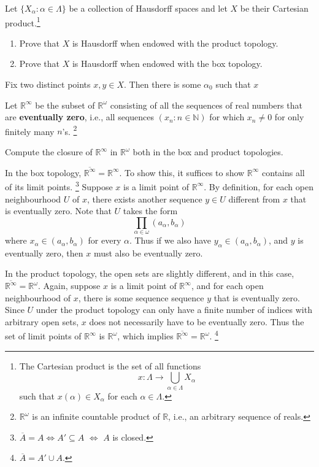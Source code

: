 \documentclass[../../main.tex]{subfiles}
\begin{document}
\begin{problem}
Let $\{ X_\alpha : \alpha \in \Lambda \}$ be a collection of Hausdorff spaces and let $X$ be their Cartesian product.\footnote{
	The Cartesian product is the set of all functions
	\[ x : \Lambda \to \bigcup_{\alpha \in \Lambda} X_\alpha \]
	such that $x(\alpha) \in X_\alpha$ for each $\alpha \in \Lambda$.
}
\end{problem}
\begin{enumerate}[label=(\alph*)]
	\item Prove that $X$ is Hausdorff when endowed with the product topology.
	\item Prove that $X$ is Hausdorff when endowed with the box topology.
\end{enumerate}
Fix two distinct points $x, y \in X$.
Then there is some $\alpha_0$ such that $x$

\begin{problem}[9]
    Let $\mathbb{R}^\infty$ be the subset of $\mathbb{R}^\omega$ consisting of all the sequences of real numbers that are \textbf{eventually zero}, i.e., all sequences $(x_n:n\in\mathbb{N})$ for which $x_n\neq 0$ for only finitely many $n$'s.
    \footnote{$\mathbb{R}^\omega$ is an infinite countable product of $\mathbb{R}$, i.e., an arbitrary sequence of reals.}

    Compute the closure of $\mathbb{R}^\infty$ in $\mathbb{R}^\omega$ both in the box and product topologies.
\end{problem}

In the box topology, $\overline{\mathbb{R}^\infty} = \mathbb{R}^\infty$.
To show this, it suffices to show $\mathbb{R}^\infty$ contains all of its limit points.
\footnote{$\overline{A} = A \Leftrightarrow A' \subseteq A$ $\Leftrightarrow$ $A$ is closed.}
Suppose $x$ is a limit point of $\mathbb{R}^\infty$.
By definition, for each open neighbourhood $U$ of $x$, there exists another sequence $y \in U$ different from $x$ that is eventually zero.
Note that $U$ takes the form
\[
    \prod_{\alpha \in \omega} (a_\alpha, b_\alpha)
\]
where $x_\alpha \in (a_\alpha, b_\alpha)$ for every $\alpha$.
Thus if we also have $y_\alpha \in (a_\alpha, b_\alpha)$, and $y$ is eventually zero, then $x$ must also be eventually zero.

In the product topology, the open sets are slightly different, and in this case, $\overline{\mathbb{R}^\infty} = \mathbb{R}^\omega$.
Again, suppose $x$ is a limit point of $\mathbb{R}^\infty$, and for each open neighbourhood of $x$, there is some sequence sequence $y$ that is eventually zero.
Since $U$ under the product topology can only have a finite number of indices with arbitrary open sets, $x$ does not necessarily have to be eventually zero.
Thus the set of limit points of $\mathbb{R}^\infty$ is $\mathbb{R}^\omega$, which implies $\overline{\mathbb{R}^\infty} = \mathbb{R}^\omega$.
\footnote{$\overline{A} = A' \cup A$.}
\end{document}

